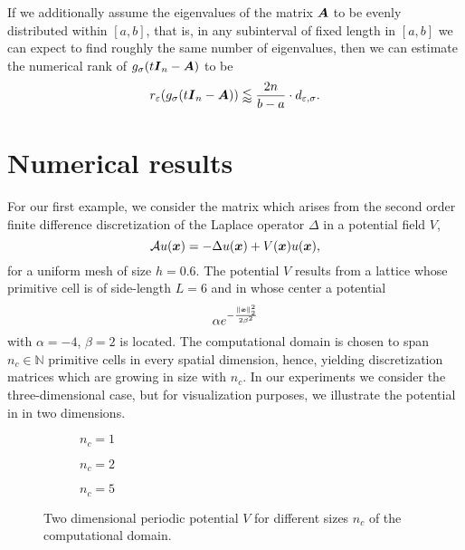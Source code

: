 \documentclass[12pt]{article}
\begin{document}
If we additionally assume the eigenvalues of the matrix $\boldsymbol{A}$ to be evenly distributed within $[a, b]$, that is, in any subinterval of fixed length in $[a, b]$ we can expect to find roughly the same number of eigenvalues, then we can estimate the numerical rank of $g_{\sigma}(t\boldsymbol{I}_n - \boldsymbol{A})$ to be
\begin{equation}
    r_{\varepsilon}(g_{\sigma}(t\boldsymbol{I}_n - \boldsymbol{A})) \lessapprox \frac{2 n}{b - a} \cdot d_{\varepsilon, \sigma}.
    \label{equ:gaussian-kernel-numerical-rank-uniform}
\end{equation}


\section{Numerical results}
\label{sec:results}

For our first example, we consider the matrix which arises from the second order
finite difference discretization of the Laplace operator $\Delta$ in a potential
field $V$,
\begin{equation}
    \mathcal{A} u(\boldsymbol{x}) = - \Delta u(\boldsymbol{x}) + V(\boldsymbol{x}) u(\boldsymbol{x}),
    \label{equ:5-experiments-electronic-hamiltonian}
\end{equation}
for a uniform mesh of size $h=0.6$. The potential $V$ results from a
lattice whose primitive cell is of side-length $L=6$ and in whose center a
potential
\begin{equation}
    \alpha e^{-\frac{\lVert \boldsymbol{x} \rVert _2^2}{ 2 \beta^2 }}
    \label{equ:5-experiments-gaussian-cell}
\end{equation}
with $\alpha = -4$, $\beta = 2$ is located. The computational domain is chosen
to span $n_c \in \mathbb{N}$ primitive cells in every spatial dimension, hence, yielding
discretization matrices which are growing in size with $n_c$. In our experiments
we consider the three-dimensional case, but for visualization purposes, we
illustrate the potential in 
in two dimensions.

\begin{figure}[ht]
    \begin{subfigure}[b]{0.32\columnwidth}
        
        \caption{$n_c=1$}
        \label{fig:gaussian-well-1}
    \end{subfigure}
    \begin{subfigure}[b]{0.32\columnwidth}
        
        \caption{$n_c=2$}
        \label{fig:gaussian-well-2}
    \end{subfigure}
    \begin{subfigure}[b]{0.32\columnwidth}
        
        \caption{$n_c=5$}
        \label{fig:gaussian-well-5}
    \end{subfigure}
    \caption{Two dimensional periodic potential $V$ for different sizes $n_c$ of the computational domain.}
    \label{fig:gaussian-well}
\end{figure}
\end{document}
